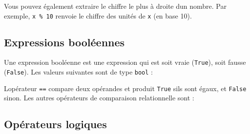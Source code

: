 Vous pouvez également extraire le chiffre le plus à droite
d\textquotesingle un nombre. Par exemple, \texttt{x\ \%\ 10} renvoie le
chiffre des unités de \texttt{x} (en base 10).

\hypertarget{expressions-booluxe9ennes}{%
\subsection{Expressions booléennes}\label{expressions-booluxe9ennes}}

Une expression booléenne est une expression qui est soit vraie
(\texttt{True}), soit fausse (\texttt{False}). Les valeurs suivantes
sont de type \texttt{bool} :

\begin{Shaded}
\begin{Highlighting}[]
\OperatorTok{\textgreater{}\textgreater{}\textgreater{}} \NormalTok{(}\NormalTok{)}
\OperatorTok{\textless{}} \OperatorTok{\textgreater{}}
\OperatorTok{\textgreater{}\textgreater{}\textgreater{}} \NormalTok{(}\NormalTok{)}
\OperatorTok{\textless{}} \OperatorTok{\textgreater{}}
\end{Highlighting}
\end{Shaded}

L\textquotesingle opérateur \texttt{==} compare deux opérandes et
produit \texttt{True} s\textquotesingle ils sont égaux, et
\texttt{False} sinon. Les autres opérateurs de comparaison relationnelle
sont :

\begin{Shaded}
\begin{Highlighting}[]
\OperatorTok{!=}
\OperatorTok{\textgreater{}}
\OperatorTok{\textless{}}
\OperatorTok{\textgreater{}=}
\OperatorTok{\textless{}=}
\end{Highlighting}
\end{Shaded}

\hypertarget{opuxe9rateurs-logiques}{%
\subsection{Opérateurs logiques}\label{opuxe9rateurs-logiques}}

